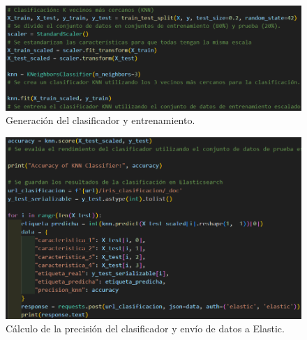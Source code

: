 \begin{figure}
    \centering
    \includegraphics[width=1\linewidth]{img/iris6.png}
    \caption{Generación del clasificador y entrenamiento.}
    \label{fig:clasificacion1}
\end{figure}
\begin{figure}
    \centering
    \includegraphics[width=1\linewidth]{img/iris7.png}
    \caption{Cálculo de la precisión del clasificador y envío de datos a Elastic.}
    \label{fig:clasificacion2}
\end{figure}

\paragraph{}
\paragraph{}


